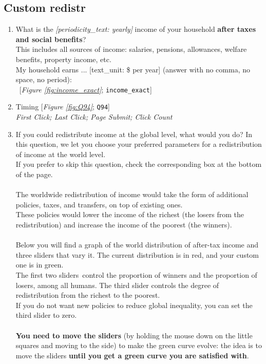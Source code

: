 \subsection*{Custom redistr} 
 \begin{enumerate}[resume] 
\item  \label{q:income_exact} What is the \textit{[periodicity\_text: yearly]} income of your household \textbf{after taxes and social benefits}?\\This includes all sources of income: salaries, pensions, allowances, welfare benefits, property income, etc.\\My household earns ... [text\_unit: \$ per year] (answer with no comma, no space, no period):\\ 
~[\textit{Figure \ref{fig:income_exact}}; 
\verb|income_exact|]


\item  \label{q:Q94} Timing [\textit{Figure \ref{fig:Q94}}; 
\verb|Q94|]
  \\ \textit{First Click; Last Click; Page Submit; Click Count}

\item  \label{q:custom_redistr} If you could redistribute income at the global level, what would you do? In this question, we let you choose your preferred parameters for a redistribution of income at the world level.~\\If you prefer to skip this question, check the corresponding box at the bottom of the page.\\\\The worldwide redistribution of income would take the form of additional policies, taxes, and transfers, on top of existing ones.\\These policies would lower the income of the richest (the losers from the redistribution) and increase the income of the poorest (the winners).~\\\\Below you will find a graph of the world distribution of after-tax income and three sliders that vary it. The current distribution is in red, and your custom one is in green.~\\The first two sliders~control the proportion of winners and the proportion of losers, among all humans. The third slider controls the degree of redistribution from the richest to the poorest.~\\If you do not want new policies to reduce global inequality, you can set the third slider to zero.~\\\\\textbf{You need to move the sliders} (by holding the mouse down on the little squares and moving to the side) to make the green curve evolve: the idea is to move the sliders \textbf{until you get a green curve you are satisfied with}. \\\\


\end{enumerate}
